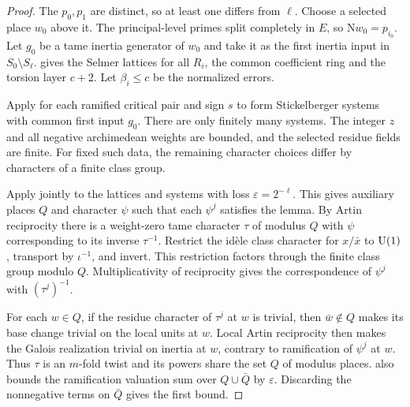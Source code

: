 \begin{proof}
The $p_0,p_1$ are distinct, so at least one differs from $\ell$. Choose a selected place $w_0$ above it. The principal-level primes split completely in $E$, so $\mathrm Nw_0=p_{i_0}$. Let $g_0$ be a tame inertia generator of $w_0$ and take it as the first inertia input in $S_0\setminus S_\ell$.  gives the Selmer lattices for all $R_i$, the common coefficient ring and the torsion layer $c+2$. Let $\beta_i\le c$ be the normalized errors.

Apply  for each ramified critical pair and sign $s$ to form Stickelberger systems with common first input $g_0$. There are only finitely many systems. The integer $z$ and all negative archimedean weights are bounded, and the selected residue fields are finite. For fixed such data, the remaining character choices differ by characters of a finite class group.

Apply  jointly to the lattices and systems with loss $\varepsilon=2^{-\ell}$. This gives auxiliary places $Q$ and character $\psi$ such that each $\psi^j$ satisfies the lemma. By Artin reciprocity there is a weight-zero tame character $\tau$ of modulus $Q$ with $\psi$ corresponding to its inverse $\tau^{-1}$. Restrict the idèle class character for $x/\bar x$ to $\operatorname{U}(1)$, transport by $\iota^{-1}$, and invert. This restriction factors through the finite class group modulo $Q$. Multiplicativity of reciprocity gives the correspondence of $\psi^j$ with $(\tau^j)^{-1}$.

For each $w\in Q$, if the residue character of $\tau^j$ at $w$ is trivial, then $\bar w\notin Q$ makes its base change trivial on the local units at $w$. Local Artin reciprocity then makes the Galois realization trivial on inertia at $w$, contrary to ramification of $\psi^j$ at $w$. Thus $\tau$ is an $m$-fold twist and its powers share the set $Q$ of modulus places.  also bounds the ramification valuation sum over $Q\cup\bar Q$ by $\varepsilon$. Discarding the nonnegative terms on $\bar Q$ gives the first bound.


\end{proof}

